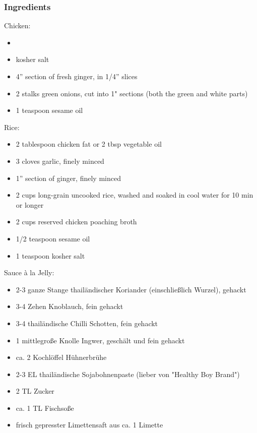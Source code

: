 \subsubsection*{Ingredients}
Chicken:
\begin{itemize}
\item[] 
\item[] kosher salt
\item[] 4'' section of fresh ginger, in 1/4'' slices
\item[] 2 stalks green onions, cut into 1" sections (both the green and white parts)
\item[] 1 teaspoon sesame oil
\end{itemize}
Rice:
\begin{itemize}
\item[] 2 tablespoon chicken fat or 2 tbsp vegetable oil
\item[] 3 cloves garlic, finely minced
\item[] 1'' section of ginger, finely minced
\item[] 2 cups long-grain uncooked rice, washed and soaked in cool water for 10 min or longer
\item[] 2 cups reserved chicken poaching broth
\item[] 1/2 teaspoon sesame oil
\item[] 1 teaspoon kosher salt
\end{itemize}
Sauce à la Jelly:
\begin{itemize}
\item[] 2-3 ganze Stange thailändischer Koriander (einschließlich Wurzel), gehackt
\item[] 3-4 Zehen Knoblauch, fein gehackt
\item[] 3-4 thailändische Chilli Schotten, fein gehackt
\item[] 1 mittlegroße Knolle Ingwer, geschält und fein gehackt
\item[] ca. 2 Kochlöffel Hühnerbrühe
\item[] 2-3 EL thailändische Sojabohnenpaste (lieber von "Healthy Boy Brand")
\item[] 2 TL Zucker
\item[] ca. 1 TL Fischsoße
\item[] frisch gepresster Limettensaft aus ca. 1 Limette
\end{itemize}

